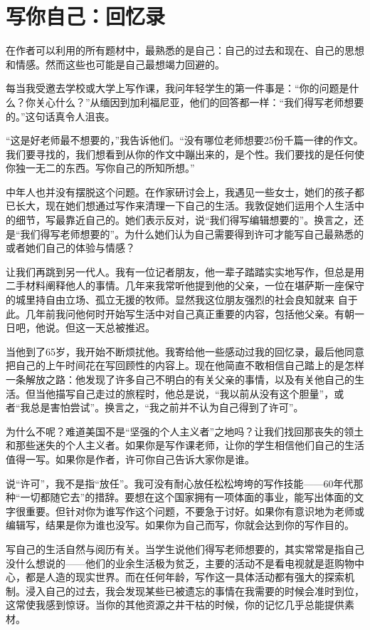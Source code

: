 \chapter{写你自己：回忆录}
在作者可以利用的所有题材中，最熟悉的是自己：自己的过去和现在、自己的思想和情感。然而这些也可能是自己最想竭力回避的。

每当我受邀去学校或大学上写作课，我问年轻学生的第一件事是：“你的问题是什么？你关心什么？”从缅因到加利福尼亚，他们的回答都一样：“我们得写老师想要的。”这句话真令人沮丧。

“这是好老师最不想要的，”我告诉他们。“没有哪位老师想要25份千篇一律的作文。我们要寻找的，我们想看到从你的作文中蹦出来的，是个性。我们要找的是任何使你独一无二的东西。写你自己的所知所想。”

中年人也并没有摆脱这个问题。在作家研讨会上，我遇见一些女士，她们的孩子都已长大，现在她们想通过写作来清理一下自己的生活。我敦促她们运用个人生活中的细节，写最靠近自己的。她们表示反对，说“我们得写编辑想要的”。换言之，还是“我们得写老师想要的”。为什么她们认为自己需要得到许可才能写自己最熟悉的或者她们自己的体验与情感？


让我们再跳到另一代人。我有一位记者朋友，他一辈子踏踏实实地写作，但总是用二手材料阐释他人的事情。几年来我常听他提到他的父亲，一位在堪萨斯一座保守的城里持自由立场、孤立无援的牧师。显然我这位朋友强烈的社会良知就来 自于此。几年前我问他何时开始写生活中对自己真正重要的内容，包括他父亲。有朝一日吧，他说。但这一天总被推迟。

当他到了65岁，我开始不断烦扰他。我寄给他一些感动过我的回忆录，最后他同意把自己的上午时间花在写回顾性的内容上。现在他简直不敢相信自己踏上的是怎样一条解放之路：他发现了许多自己不明白的有关父亲的事情，以及有关他自己的生活。但当他描写自己走过的旅程时，他总是说，“我以前从没有这个胆量”，或者“我总是害怕尝试”。换言之，“我之前并不认为自己得到了许可”。


为什么不呢？难道美国不是“坚强的个人主义者”之地吗？让我们找回那丧失的领土和那些迷失的个人主义者。如果你是写作课老师，让你的学生相信他们自己的生活值得一写。如果你是作者，许可你自己告诉大家你是谁。

说“许可”，我不是指“放任”。我可没有耐心放任松松垮垮的写作技能——60年代那种“一切都随它去”的措辞。要想在这个国家拥有一项体面的事业，能写出体面的文字很重要。但针对你为谁写作这个问题，不要急于讨好。如果你有意识地为老师或编辑写，结果是你为谁也没写。如果你为自己而写，你就会达到你的写作目的。

写自己的生活自然与阅历有关。当学生说他们得写老师想要的，其实常常是指自己没什么想说的——他们的业余生活极为贫乏，主要的活动不是看电视就是逛购物中心，都是人造的现实世界。而在任何年龄，写作这一具体活动都有强大的探索机制。浸入自己的过去，我会发现某些已被遗忘的事情在我需要的时候会准时到位，这常使我感到惊讶。当你的其他资源之井干枯的时候，你的记忆几乎总能提供素材。

